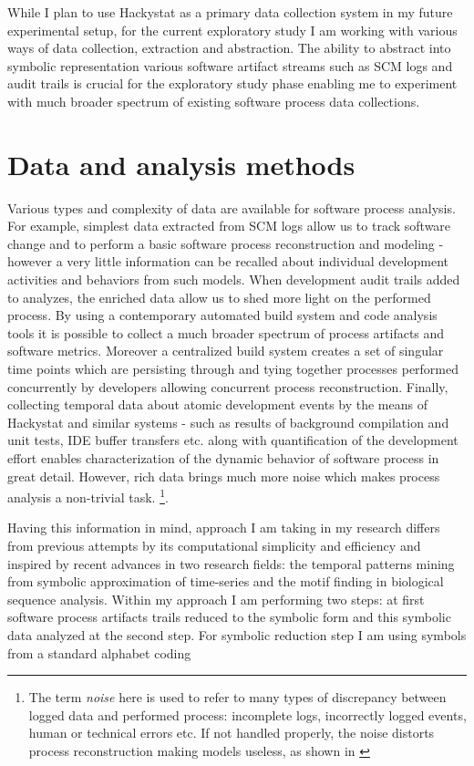 \documentclass{sig-alternate}
\begin{document}
While I plan to use Hackystat as a primary data collection system in my future experimental setup, for the current exploratory study I am working with various ways of data collection, extraction and abstraction. The ability to abstract into symbolic representation various software artifact streams such as SCM logs and audit trails is crucial for the exploratory study phase enabling me to experiment with much broader spectrum of existing software process data collections.

\section{Data and analysis methods}
Various types and complexity of data are available for software process analysis. For example, simplest data extracted from SCM logs allow us to track software change and to perform a basic software process reconstruction and modeling - however a very little information can be recalled about individual development activities and behaviors from such models. When development audit trails added to analyzes, the enriched data allow us to shed more light on the performed process. By using a contemporary automated build system and code analysis tools it is possible to collect a much broader spectrum of process artifacts and software metrics. Moreover a centralized build system creates a set of singular time points which are persisting through and tying together processes performed concurrently by developers allowing concurrent process reconstruction. Finally, collecting temporal data about atomic development events by the means of Hackystat and similar systems - such as results of background compilation and unit tests, IDE buffer transfers etc. along with quantification of the development effort enables characterization of the dynamic behavior of software process in great detail. However, rich data brings much more noise which makes process analysis a non-trivial task. \footnote{The term \textit{noise} here is used to refer to many types of discrepancy between logged data and performed process: incomplete logs, incorrectly logged events, human or technical errors etc. If not handled properly, the noise distorts process reconstruction making models useless, as shown in \cite{citeulike:2678511}}. 

Having this information in mind, approach I am taking in my research differs from previous attempts by its computational simplicity and efficiency and inspired by recent advances in two research fields: the temporal patterns mining from symbolic approximation of time-series and the motif finding in biological sequence analysis. Within my approach I am performing two steps: at first software process artifacts trails reduced to the symbolic form and this symbolic data analyzed at the second step. For symbolic reduction step I am using symbols from a standard alphabet coding 
\end{document}

